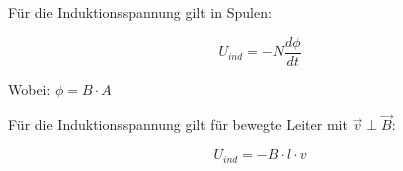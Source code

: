 Für die Induktionsspannung gilt in Spulen:

\begin{equation} \label{eq:InduGe}
	U_{ind} = -N \frac{d\phi}{dt}
\end{equation}

Wobei: $\phi = B \cdot A$

Für die Induktionsspannung gilt für bewegte Leiter mit $\vec{v} \perp \vec{B}$:

\begin{equation}
	U_{ind} = -B \cdot l \cdot v
\end{equation}